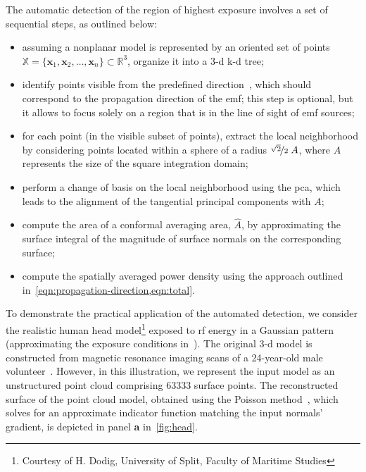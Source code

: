 The automatic detection of the region of highest exposure involves a set of sequential steps, as outlined below:
\begin{itemize}
    \item assuming a nonplanar model is represented by an oriented set of points $\mathbb{X} = \{ \mathbf{x}_1, \mathbf{x}_2, \dots, \mathbf{x}_n \} \subset \mathbb{R}^3$, organize it into a \gls{3-d} \gls{k-d} tree;
    \item identify points visible from the predefined direction~\cite{Katz2007Direct}, which should correspond to the propagation direction of the \gls{emf}; this step is optional, but it allows to focus solely on a region that is in the line of sight of \gls{emf} sources;
    \item for each point (in the visible subset of points), extract the local neighborhood by considering points located within a sphere of a radius $\nicefrac{\sqrt{2}}{2} \; A$, where $A$ represents the size of the square integration domain;
    \item perform a change of basis on the local neighborhood using the \gls{pca}, which leads to the alignment of the tangential principal components with $A$;
    \item compute the area of a conformal averaging area, $\hat A$, by approximating the surface integral of the magnitude of surface normals on the corresponding surface;
    \item compute the spatially averaged power density using the approach outlined in~\cref{eqn:propagation-direction,eqn:total}.
\end{itemize} 

To demonstrate the practical application of the automated detection, we consider the realistic human head model\footnote{Courtesy of H. Dodig, University of Split, Faculty of Maritime Studies} exposed to \gls{rf} energy in a Gaussian pattern~\cite{Foster2016Thermal} (approximating the exposure conditions in~\cite{Colombi2015Implications}).
The original \gls{3-d} model is constructed from magnetic resonance imaging scans of a \num{24}-year-old male volunteer~\cite{Laakso2015Intersubject}.
However, in this illustration, we represent the input model as an unstructured point cloud comprising \num{63333} surface points.
The reconstructed surface of the point cloud model, obtained using the Poisson method~\cite{Kazhdan2006Poisson}, which solves for an approximate indicator function matching the input normals' gradient, is depicted in panel \textbf{a} in~\cref{fig:head}.

